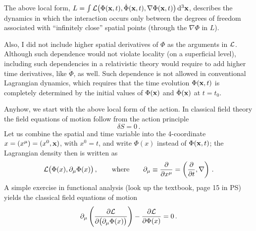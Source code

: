 \begin{enumerate}
The above local form,
$L=\int\mathcal{L}\bigl(\Phi(\mathbf{x},t),\dot\Phi(\mathbf{x},t),\nabla\Phi(\mathbf{x},t)\bigr)\mathop{}\!\mathrm{d}^3\mathbf{x}$,
describes the dynamics in which the interaction occurs only between the
degrees of freedom associated with ``infinitely close'' spatial points
(through the $\nabla\Phi$ in $L$).

Also, I did not include higher spatial derivatives of $\Phi$ as the arguments
in $\mathcal{L}$. Although such dependence would not violate locality (on a
superficial level), including such dependencies in a relativistic theory
would require to add higher time derivatives, like $\ddot\Phi$, as well. Such
dependence is not allowed in conventional Lagrangian dynamics, which requires
that the time evolution $\Phi(\mathbf{x},t)$ is completely determined by the initial
values of $\Phi(\mathbf{x})$ and $\dot\Phi(\mathbf{x})$ at $t=t_0$.
\end{enumerate}

Anyhow, we start with the above local form of the action. In classical field
theory the field equations of motion follow from the action principle
\[
\delta S=0\,.
\]
Let us combine the spatial and time variable into the 4-coordinate
$x=(x^\mu)=(x^0,\mathbf{x})$, with $x^0=t$, and write $\Phi(x)$ instead of
$\Phi(\mathbf{x},t)$; the Lagrangian density then is written as
\[
\mathcal{L}\bigl(\Phi(x),\partial_\mu\Phi(x)\bigr)\,,
\qquad\text{where}\qquad
\partial_\mu\equiv\frac{\partial}{\partial x^\mu}=\left(\frac{\partial}{\partial t},\nabla\right)\,.
\]
A simple exercise in functional analysis (look up the textbook, page 15 in
PS) yields the classical field equations of motion
\begin{equation}\label{eq:EL}
\partial_\mu\left(\frac{\partial\mathcal{L}}{\partial\bigl(\partial_\mu\Phi(x)\bigr)}\right)-\frac{\partial\mathcal{L}}{\partial\Phi(x)}=0\,.
\end{equation}

